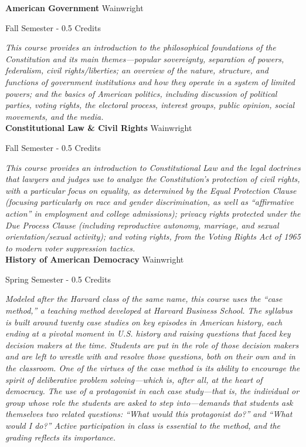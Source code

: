 \noindent\textbf{American Government} \hfill Wainwright

\noindent Fall Semester - 0.5 Credits

\vspace{1mm}\emph{This course provides an introduction to the philosophical foundations of the Constitution and its main themes—popular sovereignty, separation of powers, federalism, civil rights/liberties; an overview of the nature, structure, and functions of government institutions and how they operate in a system of limited powers; and the basics of American politics, including discussion of political parties, voting rights, the electoral process, interest groups, public opinion, social movements, and the media.}\\


\noindent\textbf{Constitutional Law \& Civil Rights} \hfill Wainwright

\noindent Fall Semester - 0.5 Credits

\vspace{1mm}\emph{This course provides an introduction to Constitutional Law and the legal doctrines that lawyers and judges use to analyze the Constitution’s protection of civil rights, with a particular focus on equality, as determined by the Equal Protection Clause (focusing particularly on race and gender discrimination, as well as “affirmative action” in employment and college admissions); privacy rights protected under the Due Process Clause (including reproductive autonomy, marriage, and sexual orientation/sexual activity); and voting rights, from the Voting Rights Act of 1965 to modern voter suppression tactics.}\\


\noindent\textbf{History of American Democracy} \hfill Wainwright

\noindent Spring Semester - 0.5 Credits

\vspace{1mm}\emph{Modeled after the Harvard class of the same name, this course uses the “case method,” a teaching method developed at Harvard Business School. The syllabus is built around twenty case studies on key episodes in American history, each ending at a pivotal moment in U.S. history and raising questions that faced key decision makers at the time. Students are put in the role of those decision makers and are left to wrestle with and resolve those questions, both on their own and in the classroom. One of the virtues of the case method is its ability to encourage the spirit of deliberative problem solving—which is, after all, at the heart of democracy. The use of a protagonist in each case study—that is, the individual or group whose role the students are asked to step into—demands that students ask themselves two related questions: “What would this protagonist do?” and “What would I do?” Active participation in class is essential to the method, and the grading reflects its importance.}\\


